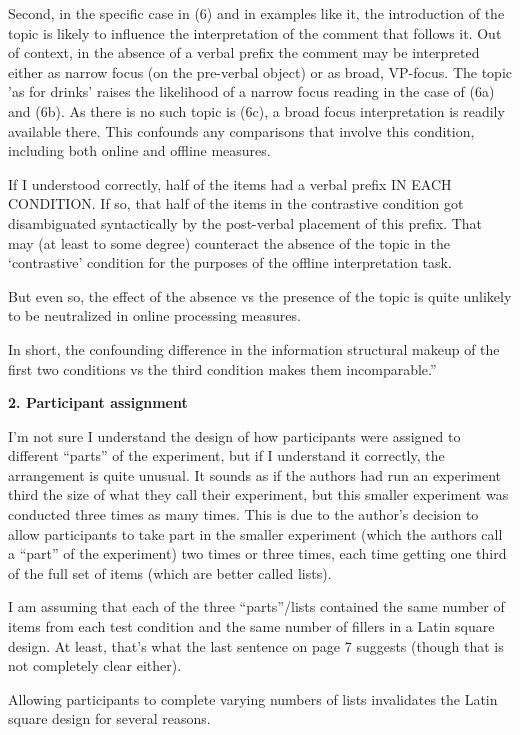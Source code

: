\documentclass[a4paper, ruler]{CUP-JNL-LIN}%
\begin{document}
Second, in the specific case in (6) and in examples like it, the introduction of the topic is likely to influence the interpretation of the comment that follows it. Out of context, in the absence of a verbal prefix the comment may be interpreted either as narrow focus (on the pre-verbal object) or as broad, VP-focus. The topic 'as for drinks' raises the likelihood of a narrow focus reading in the case of (6a) and (6b). As there is no such topic is (6c), a broad focus interpretation is readily available there. This confounds any comparisons that involve this condition, including both online and offline measures.

If I understood correctly, half of the items had a verbal prefix IN EACH CONDITION. If so, that half of the items in the contrastive condition got disambiguated syntactically by the post-verbal placement of this prefix. That may (at least to some degree) counteract the absence of the topic in the ‘contrastive’ condition for the purposes of the offline interpretation task.

But even so, the effect of the absence vs the presence of the topic is quite unlikely to be neutralized in online processing measures.

In short, the confounding difference in the information structural makeup of the first two conditions vs the third condition makes them incomparable.”

\textbf{2. Participant assignment}

I'm not sure I understand the design of how participants were assigned to different “parts” of the experiment, but if I understand it correctly, the arrangement is quite unusual. It sounds as if the authors had run an experiment third the size of what they call their experiment, but this smaller experiment was conducted three times as many times. This is due to the author’s decision to allow participants to take part in the smaller experiment (which the authors call a “part” of the experiment) two times or three times, each time getting one third of the full set of items (which are better called lists).

I am assuming that each of the three “parts”/lists contained the same number of items from each test condition and the same number of fillers in a Latin square design. At least, that's what the last sentence on page 7 suggests (though that is not completely clear either).

Allowing participants to complete varying numbers of lists invalidates the Latin square design for several reasons.
\end{document}
